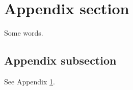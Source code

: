 
\appendix

\section{Appendix section}\label{app}

Some words.

\subsection{Appendix subsection}

See Appendix \ref{app}.
